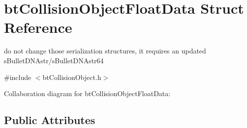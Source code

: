 \hypertarget{structbt_collision_object_float_data}{\section{bt\+Collision\+Object\+Float\+Data Struct Reference}
\label{structbt_collision_object_float_data}
}


do not change those serialization structures, it requires an updated s\+Bullet\+D\+N\+Astr/s\+Bullet\+D\+N\+Astr64  




{\ttfamily \#include $<$bt\+Collision\+Object.\+h$>$}



Collaboration diagram for bt\+Collision\+Object\+Float\+Data\+:
\subsection*{Public Attributes}
